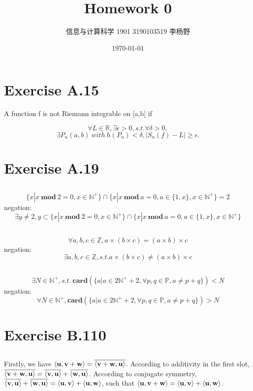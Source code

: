 \documentclass{article}
\title{Homework 0}
\author{信息与计算科学 1901 3190103519 李杨野}
\date{\today}
\begin{document}
\begin{spacing}{1.0}
    \maketitle
    \section{Exercise A.15}
    A function f is not Riemann integrable on [a,b] if 
    
    $$ \forall L \in \mathbb{R}, \exists \epsilon > 0, s.t. \forall \delta > 0,$$
    $$ \exists P_{n}(a,b) \ with \ h(P_{n}) < \delta, |S_{n}(f) - L| \geq \epsilon. $$ 

    \section{Exercise A.19}
    \subsection{}
    $$\{x|x \ \mathbf{mod} \ 2 = 0,x \in \mathbb{N^+} \} \cap \{x|x \ \mathbf{mod} \ a = 0, a \in \{1,x\},x \in \mathbb{N^+} \} = {2}$$
    negation:
    $$ \exists y \neq 2,y \subset \{x|x \ \mathbf{mod} \ 2 = 0,x \in \mathbb{N^+} \} \cap \{x|x \ \mathbf{mod} \ a = 0, a \in \{1,x\},x \in \mathbb{N^+} \}$$
    \subsection{}
    $$\forall a,b,c \in \mathbb{Z}, a \times (b \times c) = (a \times b)\times c$$
    negation:
    $$\exists a,b,c \in \mathbb{Z}, s.t. a \times (b \times c) \neq (a \times b)\times c$$
    \subsection{}
    $$\exists N \in \mathbb{N^+},s.t. \ \mathbf{card}(\{a|a \in 2\mathbb{N^+}+2, \forall p,q \in \mathbb{P},a \neq p+q\}) < N$$
    negation:
    $$\forall N \in \mathbb{N^+}, \mathbf{card}(\{a|a \in 2\mathbb{N^+}+2, \forall p,q \in \mathbb{P},a \neq p+q\}) > N$$
    \section{Exercise B.110}
    \subsection{}
    Firstly, we have $\left\langle{ \bf{u},\bf{v+w} }\right\rangle = \overline{\left\langle{ \bf{v+w},\bf{u} }\right\rangle}$. 
    According to additivity in the first slot, $\overline{\left\langle{ \bf{v+w},\bf{u} }\right\rangle} = \overline{\left\langle{ \bf{v},\bf{u} }\right\rangle} + \overline{\left\langle{ \bf{w},\bf{u} }\right\rangle}$.
    According to conjugate symmetry, $\overline{\left\langle{ \bf{v},\bf{u} }\right\rangle} + \overline{\left\langle{ \bf{w},\bf{u} }\right\rangle} = \left\langle{ \bf{u},\bf{v} }\right\rangle + \left\langle{ \bf{u},\bf{w} }\right\rangle $,
    such that $\left\langle{ \bf{u},\bf{v+w} }\right\rangle = \left\langle{ \bf{u},\bf{v} }\right\rangle + \left\langle{ \bf{u},\bf{w} }\right\rangle $.

\end{spacing}
\end{document}
